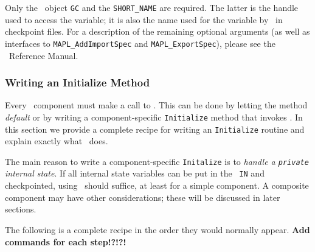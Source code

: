 Only the \egc\ object \texttt{GC} and the {\tt SHORT\_NAME} are required. The
latter is the handle used to access the variable; it is also the name
used for the variable by \ggn\  in checkpoint files. For a description of
the remaining optional arguments (as well as interfaces to
\texttt{MAPL\_AddImportSpec} and \texttt{MAPL\_ExportSpec}), please see
the \ggn\ Reference Manual.


\subsubsection{Writing an Initialize Method}

Every \ggn\ component must make a call to \gint. This can be done by
letting the method \emph{default} or by writing a component-specific
\texttt{Initialize} method that invokes \gint.  In this section we provide a
complete recipe for writing an \texttt{Initialize} routine and explain
exactly what \gint\  does.

The main reason to write a component-specific \texttt{Initalize} is to
\emph{handle a \texttt{private} internal state}.
If all internal state variables can be put in
the \ggn\ {\tt IN} and checkpointed, using \gint\  should
suffice, at least for a simple component. A composite component may
have other considerations; these will be discussed in later
sections.

The following is a complete recipe in the order they would normally appear.
\textbf{Add commands for each step!?!?!}

